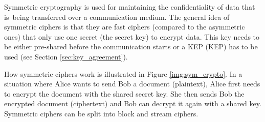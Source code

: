 Symmetric cryptography is used for maintaining the confidentiality of data that is~being transferred over a communication medium. The general idea of symmetric ciphers is that they are fast ciphers (compared to the asymmetric ones) that only use one secret (the secret key) to encrypt data. This key needs to be either pre-shared before the communication starts or a KEP ({\acl{KEP}}) has to be used (see Section \ref{sec:key_agreement}). \cite{Ristic2014}

How symmetric ciphers work is illustrated in Figure \ref{img:sym_crypto}. In a situation where Alice wants to send Bob a document (plaintext), Alice first needs to encrypt the document with the shared secret key. She then sends Bob the encrypted document (ciphertext) and Bob can decrypt it again with a shared key. Symmetric ciphers can be split into block and stream ciphers.

